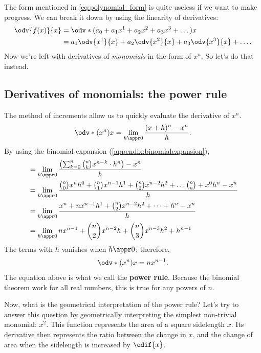 The form mentioned in \cref{eq:polynomial_form} is quite useless if we want to make progress. We can break it down by using the linearity of derivatives:
\begin{align}
	\odv{f(x)}{x} & = \odv*{(a_0 + a_1x^1 + a_2x^2 + a_3x^3 + \dots)}{x}            \\
	              & = a_1\odv{x^1}{x} + a_2\odv{x^2}{x} + a_3\odv{x^3}{x} + \dots.
\end{align}
Now we're left with derivatives of \emph{monomials} in the form of $x^n$. So let's do that instead.

\subsection{Derivatives of monomials: the power rule}
\label{sec:derivativespowerrule}

The method of increments allow us to quickly evaluate the derivative of $x^n$.
\begin{equation}
	\odv*{(x^n)}{x} = \lim_{h \appr 0}\frac{(x + h)^n - x^n}{h}.
\end{equation}
By using the binomial expansion (\cref{appendix:binomialexpansion}), 
\begin{align}
	 & = \lim_{h \appr 0}\frac{\left(\sum_{k = 0}^n{n\choose k}x^{n - k}\cdot h^n\right) - x^n}{h}                                            \\
	 & = \lim_{h \appr 0}{{n\choose 0}x^nh^0 + {n\choose 1}x^{n - 1}h^1 + {n\choose 2}x^{n - 2}h^2 +\dots {n\choose n} + x^0h^n - x^n\over h} \\
	 & = \lim_{h \appr 0}\frac{x^n + nx^{n - 1}h^1 + {n\choose 2}x^{n - 2}h^2 + \dots + h^n -x^n}{h}                                          \\
	 & = \lim_{h \appr 0}nx^{n - 1} + {n\choose 2}x^{n - 2}h + {n\choose 3}x^{n - 3}h^2 + h^{n - 1}
\end{align}
The terms with $h$ vanishes when $h \appr 0$; therefore,
\begin{equation}
	\odv*{(x^n)}{x} = nx^{n - 1}. \label{eq:power_rule}
\end{equation}
The equation above is what we call the \textbf{power rule}. Because the binomial theorem work for all real numbers, this is true for any powers of $n$.

Now, what is the geometrical interpretation of the power rule? Let's try to answer this question by geometrically interpreting the simplest non-trivial monomial: $x^2$. This function represents the area of a square sidelength $x$. Its derivative then represents the ratio between the change in $x$, and the change of area when the sidelength is increased by $\odif{x}$.

